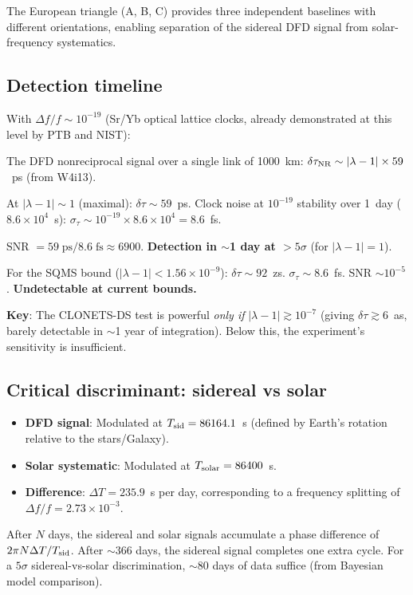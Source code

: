\documentclass[11pt]{article}
\newcommand{\ee}[1]{\times 10^{#1}}
\begin{document}
The European triangle (A, B, C) provides three independent baselines
with different orientations, enabling separation of the sidereal
DFD signal from solar-frequency systematics.

\subsection{Detection timeline}

With $\Delta f/f \sim 10^{-19}$ (Sr/Yb optical lattice clocks, already
demonstrated at this level by PTB and NIST):

The DFD nonreciprocal signal over a single link of 1000~km:
$\delta\tau_{\rm NR} \sim |\lambda - 1| \times 59$~ps (from W4i13).

At $|\lambda - 1| \sim 1$ (maximal): $\delta\tau \sim 59$~ps.
Clock noise at $10^{-19}$ stability over 1~day ($8.6\ee{4}$~s):
$\sigma_\tau \sim 10^{-19} \times 8.6\ee{4} = 8.6$~fs.

SNR $= 59\;\text{ps} / 8.6\;\text{fs} \approx 6900$.
\textbf{Detection in $\sim$1 day at $>5\sigma$} (for $|\lambda - 1| = 1$).

For the SQMS bound ($|\lambda - 1| < 1.56\ee{-9}$):
$\delta\tau \sim 92$~zs. $\sigma_\tau \sim 8.6$~fs.
SNR $\sim 10^{-5}$. \textbf{Undetectable at current bounds.}

\textbf{Key}: The CLONETS-DS test is powerful \emph{only if}
$|\lambda - 1| \gtrsim 10^{-7}$ (giving $\delta\tau \gtrsim 6$~as,
barely detectable in $\sim$1 year of integration). Below this,
the experiment's sensitivity is insufficient.

\subsection{Critical discriminant: sidereal vs solar}

\begin{itemize}[nosep]
\item \textbf{DFD signal}: Modulated at $T_{\rm sid} = 86164.1$~s
  (defined by Earth's rotation relative to the stars/Galaxy).
\item \textbf{Solar systematic}: Modulated at $T_{\rm solar} = 86400$~s.
\item \textbf{Difference}: $\Delta T = 235.9$~s per day, corresponding
  to a frequency splitting of $\Delta f/f = 2.73\ee{-3}$.
\end{itemize}

After $N$ days, the sidereal and solar signals accumulate a phase
difference of $2\pi N \Delta T / T_{\rm sid}$. After $\sim$366 days,
the sidereal signal completes one extra cycle. For a $5\sigma$
sidereal-vs-solar discrimination, $\sim$80 days of data suffice
(from Bayesian model comparison).
\end{document}
